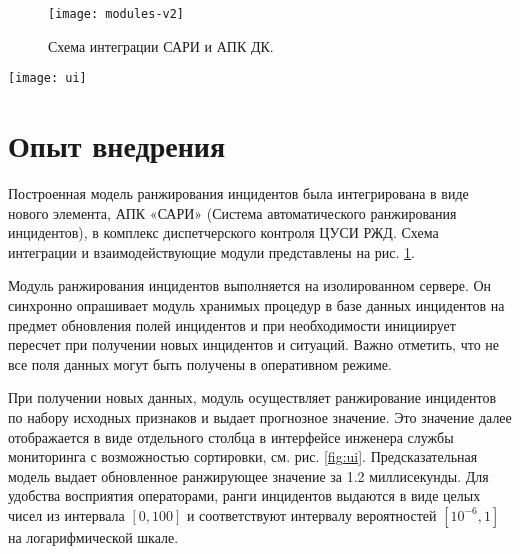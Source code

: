 
\begin{figure}[thb] 
\centering
\texttt{[image: modules-v2]}
\centering
\caption{Схема интеграции САРИ и АПК ДК.}
\centering
\label{fig:modules}
\end{figure}

\begin{figure*}[thb] 
\centering
\texttt{[image: ui]}
\caption{Отображение результатов ранжирования в пользовательском интерфейсе инженера службы мониторинга.}
\centering
\label{fig:ui}
\end{figure*}


\section{Опыт внедрения}
Построенная модель ранжирования инцидентов была интегрирована в виде нового элемента, АПК «САРИ» (Система автоматического ранжирования инцидентов), в комплекс диспетчерского контроля ЦУСИ РЖД.   Схема интеграции и взаимодействующие модули представлены на рис. \ref{fig:modules}. 

Модуль ранжирования инцидентов выполняется на изолированном сервере. Он синхронно опрашивает модуль хранимых процедур в базе данных инцидентов на предмет обновления полей инцидентов и при необходимости инициирует пересчет при получении новых инцидентов и ситуаций. Важно отметить, что не все поля данных могут быть получены в оперативном режиме.

При получении новых данных, модуль осуществляет ранжирование инцидентов по набору исходных признаков и выдает прогнозное значение. Это значение далее отображается в виде отдельного столбца в интерфейсе инженера службы мониторинга с возможностью сортировки, см. рис. \ref{fig:ui}. Предсказательная модель выдает обновленное ранжирующее значение за 1.2 миллисекунды. Для удобства восприятия операторами, ранги инцидентов выдаются в виде целых чисел из интервала $[0,100]$ и соответствуют интервалу вероятностей $[10^{-6},1]$ на логарифмической шкале.



